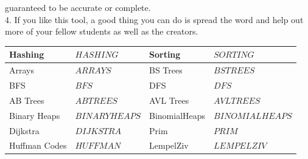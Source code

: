\documentclass[12pt]{article}
\begin{document}
    guaranteed to be accurate or complete.
    \\[0.2in]
    4. If you like this tool, a good thing you can do is spread the word and help out more of your fellow students as well as the creators.
    \vspace{20px}
    \begin{center}
        \begin{tabular}{|P{2.5cm}|P{2.5cm}|P{2.5cm}|P{2.5cm}|}
            \hline
            Hashing & $HASHING$ & Sorting & $SORTING$ \\ \hline
            Arrays & $ARRAYS$ & BS Trees & $BSTREES$ \\ \hline
            BFS & $BFS$ & DFS & $DFS$ \\ \hline
            AB Trees & $ABTREES$ & AVL Trees & $AVLTREES$ \\ \hline
            Binary Heaps & $BINARYHEAPS$ & BinomialHeaps & $BINOMIALHEAPS$ \\ \hline
            Dijkstra & $DIJKSTRA$ & Prim & $PRIM$ \\ \hline
            Huffman Codes & $HUFFMAN$ & LempelZiv &  $LEMPELZIV$ \\ \hline
        \end{tabular}
    \end{center}
\end{document}
